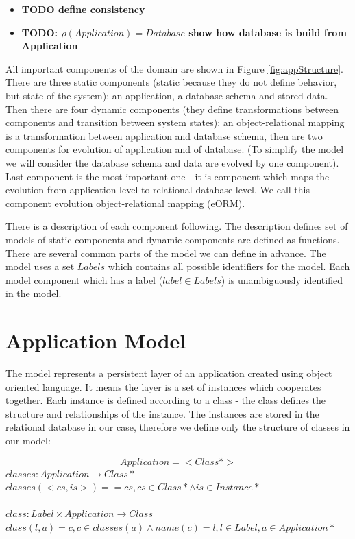 \documentclass[11pt]{article}
\begin{document}
\begin{itemize}
	\item \textbf{TODO define consistency}
	\item \textbf{TODO: $\rho(Application) = Database$ show how database is build from Application}
\end{itemize}


All important components of the domain are shown in Figure \ref{fig:appStructure}. There are three static components (static because they do not define behavior, but state of the system): an application, a database schema and stored data. Then there are four dynamic components (they define transformations between components and transition between system states): an object-relational mapping is a transformation between application and database schema, then are two components for evolution of application and of database. (To simplify the model we will consider the database schema and data are evolved by one component). Last component is the most important one - it is component which maps the evolution from application level to relational database level. We call this component evolution object-relational mapping (eORM).


There is a description of each component following. The description defines set of models of static components and dynamic components are defined as functions. There are several common parts of the model we can define in advance. The model uses a set $Labels$ which contains all possible identifiers for the model. Each model component which has a label ($label \in Labels$) is unambiguously identified in the model.





\section{Application Model}
The model represents a persistent layer of an application created using object oriented language. It means the layer is a set of instances which cooperates together. Each instance is defined according to a class - the class defines the structure and relationships of the instance. The instances are stored in the relational database in our case, therefore we define only the structure of classes in our model:
 
$$
Application = <Class*>
$$
$classes : Application \rightarrow Class*$ \\
$classes(<cs, is >) = = cs, cs \in Class* \wedge is \in Instance* $ \\ \\
$class : Label \times Application \rightarrow Class  $ \\ 
$class(l, a) = c, c \in classes(a) \wedge name(c) = l, l \in Label, a \in Application* $ \\
\end{document}
